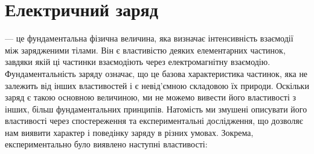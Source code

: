 

\section{Електричний заряд}

 --- це фундаментальна фізична величина, яка визначає інтенсивність взаємодії між зарядженими тілами. Він є властивістю деяких
елементарних частинок, завдяки якій ці частинки взаємодіють через електромагнітну взаємодію. Фундаментальність заряду означає, що це базова
характеристика частинок, яка не залежить від інших властивостей і є невід'ємною складовою їх природи. Оскільки заряд є такою основною величиною, ми не
можемо вивести його властивості з інших, більш фундаментальних принципів. Натомість ми змушені описувати його властивості через спостереження та
експериментальні дослідження, що дозволяє нам виявити характер і поведінку заряду в різних умовах. Зокрема, експериментально було виявлено наступні
властивості:

